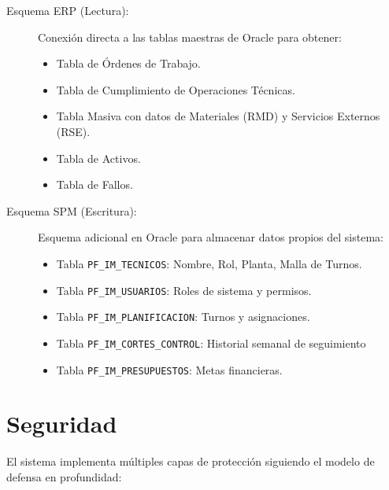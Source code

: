 \documentclass[11pt, letterpaper]{article}
\begin{document}
\begin{description}
    \item[Esquema ERP (Lectura):] Conexión directa a las tablas maestras de Oracle para obtener:
    \begin{itemize}
        \item Tabla de Órdenes de Trabajo.
        \item Tabla de Cumplimiento de Operaciones Técnicas.
        \item Tabla Masiva con datos de Materiales (RMD) y Servicios Externos (RSE).
        \item Tabla de Activos.
        \item Tabla de Fallos.
    \end{itemize}
    
    \item[Esquema SPM (Escritura):] Esquema adicional en Oracle para almacenar datos propios del sistema:
    \begin{itemize}
        \item Tabla \texttt{PF\_IM\_TECNICOS}: Nombre, Rol, Planta, Malla de Turnos.
        \item Tabla \texttt{PF\_IM\_USUARIOS}: Roles de sistema y permisos.
        \item Tabla \texttt{PF\_IM\_PLANIFICACION}: Turnos y asignaciones.
        \item Tabla \texttt{PF\_IM\_CORTES\_CONTROL}: Historial semanal de seguimiento
        \item Tabla \texttt{PF\_IM\_PRESUPUESTOS}: Metas financieras.
    \end{itemize}
\end{description}


\section{Seguridad}

El sistema implementa múltiples capas de protección siguiendo el modelo de defensa en profundidad:
\end{document}
